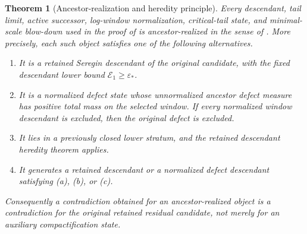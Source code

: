 \documentclass[11pt]{amsart}
\numberwithin{equation}{section}
\theoremstyle{plain}
\newtheorem{theorem}{Theorem}[section]
\theoremstyle{definition}
\theoremstyle{remark}
\newcommand{\eps}{\varepsilon}
\newcommand{\calE}{\mathcal E}
\begin{document}
\begin{theorem}[Ancestor-realization and heredity principle]
\label{thm:ancestor-realization-discharge}
Every descendant, tail limit, active successor, log-window normalization,
critical-tail state, and minimal-scale blow-down used in the proof of
 is ancestor-realized in the
sense of .  More precisely, each
such object satisfies one of the following alternatives.
\begin{enumerate}[label=\textup{(\alph*)}]
   \item It is a retained Seregin descendant of the original candidate, with
   the fixed descendant lower bound \(\calE_1\ge\eps_*\).
   \item It is a normalized defect state whose unnormalized ancestor defect
   measure has positive total mass on the selected window.  If every normalized
   window descendant is excluded, then the original defect is excluded.
   \item It lies in a previously closed lower stratum, and the retained
   descendant heredity theorem applies.
   \item It generates a retained descendant or a normalized defect descendant
   satisfying \textup{(a)}, \textup{(b)}, or \textup{(c)}.
\end{enumerate}
Consequently a contradiction obtained for an ancestor-realized object is a
contradiction for the original retained residual candidate, not merely for an
auxiliary compactification state.
\end{theorem}
\end{document}

